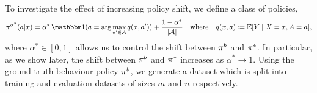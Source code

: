 To investigate the effect of increasing policy shift, we define a class of policies,
\[
\pi^{\alpha^\ast}(a | x) = \alpha^\ast\,\ind(a = \arg\max_{a'\in \Aspace} q(x, a')) + \frac{1-\alpha^\ast}{|\Aspace|} \quad \textup{where} \quad q(x, a) \coloneqq \E[Y\mid X=x, A=a],
\]
where $\alpha^\ast \in [0, 1]$ allows us to control the shift between $\pi^b$ and $\pi^*$. In particular, as we show later, the shift between $\pi^b$ and $\pi^*$ increases as $\alpha^\ast \rightarrow 1$. Using the ground truth behaviour policy $\pi^b$, we generate a dataset which is split into training and evaluation datasets of sizes $m$ and $n$ respectively. 






